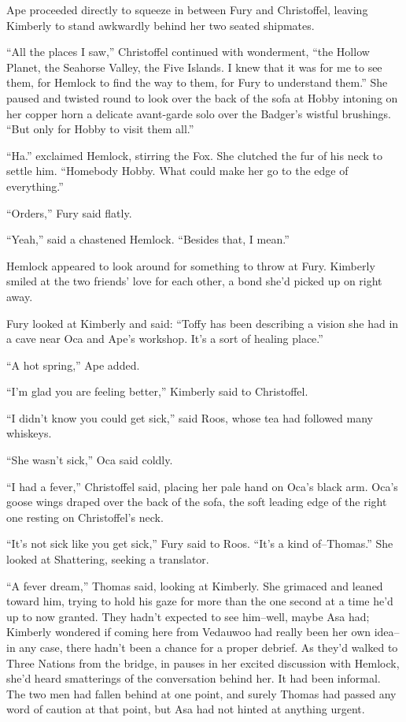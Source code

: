 \documentclass[11pt,a5paper]{article}
\begin{document}
Ape proceeded directly to squeeze in between Fury and Christoffel, leaving Kimberly to stand awkwardly behind her two seated shipmates.

``All the places I saw,'' Christoffel continued with wonderment, ``the Hollow Planet, the Seahorse Valley, the Five Islands. I knew that it was for me to see them, for Hemlock to find the way to them, for Fury to understand them.'' She paused and twisted round to look over the back of the sofa at Hobby intoning on her copper horn a delicate avant-garde solo over the Badger's wistful brushings. ``But only for Hobby to visit them all.''

``Ha.'' exclaimed Hemlock, stirring the Fox. She clutched the fur of his neck to settle him. ``Homebody Hobby. What could make her go to the edge of everything.''

``Orders,'' Fury said flatly.

``Yeah,'' said a chastened Hemlock. ``Besides that, I mean.''

Hemlock appeared to look around for something to throw at Fury. Kimberly smiled at the two friends' love for each other, a bond she'd picked up on right away.

Fury looked at Kimberly and said: ``Toffy has been describing a vision she had in a cave near Oca and Ape's workshop. It's a sort of healing place.''

``A hot spring,'' Ape added.

``I'm glad you are feeling better,'' Kimberly said to Christoffel.

``I didn't know you could get sick,'' said Roos, whose tea had followed many whiskeys.

``She wasn't sick,'' Oca said coldly.

``I had a fever,'' Christoffel said, placing her pale hand on Oca's black arm. Oca's goose wings draped over the back of the sofa, the soft leading edge of the right one resting on Christoffel's neck.

``It's not sick like you get sick,'' Fury said to Roos. ``It's a kind of--Thomas.'' She looked at Shattering, seeking a translator.

``A fever dream,'' Thomas said, looking at Kimberly. She grimaced and leaned toward him, trying to hold his gaze for more than the one second at a time he'd up to now granted. They hadn't expected to see him--well, maybe Asa had; Kimberly wondered if coming here from Vedauwoo had really been her own idea--in any case, there hadn't been a chance for a proper debrief. As they'd walked to Three Nations from the bridge, in pauses in her excited discussion with Hemlock, she'd heard smatterings of the conversation behind her. It had been informal. The two men had fallen behind at one point, and surely Thomas had passed any word of caution at that point, but Asa had not hinted at anything urgent.
\end{document}
